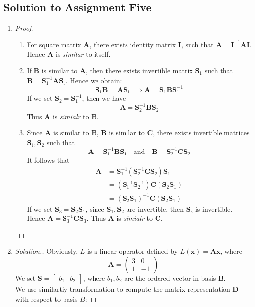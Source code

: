 \subsection{Solution to Assignment Five}
\begin{enumerate}
\item\begin{proof}
\begin{enumerate}
\item
For square matrix $\bm A$, there exists identity matrix $\bm I$, such that $\bm A=\bm I^{-1}\bm A\bm I$. Hence $\bm A$ is \textit{similar} to itself.
\item
If $\bm B$ is similar to $\bm A$, then there exists invertible matrix $\bm S_1$ such that $\bm B=\bm S_1^{-1}\bm A\bm S_1$. Hence we obtain:
\[
\bm S_1\bm B=\bm A\bm S_1\implies 
\bm A=\bm S_1\bm B\bm S_1^{-1}
\]
If we set $\bm S_2=\bm S_1^{-1}$, then we have
\[
\bm A=\bm S_2^{-1}\bm B\bm S_2
\]
Thus $\bm A$ is \emph{simialr} to $\bm B$.
\item
Since $\bm A$ is similar to $\bm B$, $\bm B$ is similar to $\bm C$, there exists invertible matrices $\bm S_1,\bm S_2$ such that
\[
\bm A=\bm S_1^{-1}\bm B\bm S_1\quad\text{and}\quad
\bm B=\bm S_2^{-1}\bm C\bm S_2
\]
It follows that 
\[\begin{aligned}
\bm A&=\bm S_1^{-1}(\bm S_2^{-1}\bm C\bm S_2)\bm S_1\\
     &=(\bm S_1^{-1}\bm S_2^{-1})\bm C(\bm S_2\bm S_1)\\
     &=(\bm S_2\bm S_1)^{-1}\bm C(\bm S_2\bm S_1)
\end{aligned}
\]
If we set $\bm S_3=\bm S_2\bm S_1$, since $\bm S_1,\bm S_2$ are invertible, then $\bm S_3$ is invertible.\\
Hence $\bm A=\bm S_3^{-1}\bm C\bm S_3$. Thus $\bm A$ is \emph{simialr} to $\bm C$.
\end{enumerate}\end{proof}
\item\begin{proof}[Solution.]
Obviously, $L$ is a linear operator defined by $L(\bm x)=\bm{Ax}$, where 
\[
\bm A=\begin{pmatrix}
3&0\\1&-1
\end{pmatrix}
\]
We set $\bm S=\begin{bmatrix}
b_1&b_2
\end{bmatrix}$, where $b_1,b_2$ are the ordered vector in basis $\bm B$. \\
We use similartiy transformation to compute the matrix representation $\bm D$ with respect to basis $B$:

\end{proof}
\end{enumerate}
